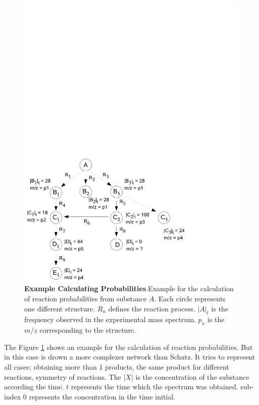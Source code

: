 \documentclass[10pt]{bmc_article}
\newenvironment{bmcformat}{\begin{raggedright}\baselineskip20pt\sloppy\setboolean{publ}{false}}{\end{raggedright}\baselineskip20pt\sloppy}
\begin{document}
\begin{bmcformat}
\begin{figure}[h]
 \begin{center}
\includegraphics[scale=.8]{figures/exampleReaction.pdf} \caption[Example Calculating 
Probabilities]{{\bf{Example Calculating Probabilities}}.Example for the 
calculation of reaction probabilities from substance $A$. Each circle 
represents one different structure. $R_n$ defines the reaction process. $|A|_t$ 
is the frequency observed in the experimental mass spectrum. $p_n$ is the $m/z$ 
corresponding to the structure.}
  \label{fig:exampleReaction}
 \end{center}
\end{figure}

The Figure \ref{fig:exampleReaction} shows an example for the calculation of 
reaction probabilities. But in this case is drown a more complexer network than 
Schutz. It tries to represent all cases; obtaining more than 1 products, the 
same product for different reactions, symmetry of reactions. The $|X|$ is the 
concentration of the substance according the time. $t$ represents the time 
which the spectrum was obtained. sub-index $0$ represents the concentration in 
the time initial.




\end{bmcformat}
\end{document}
